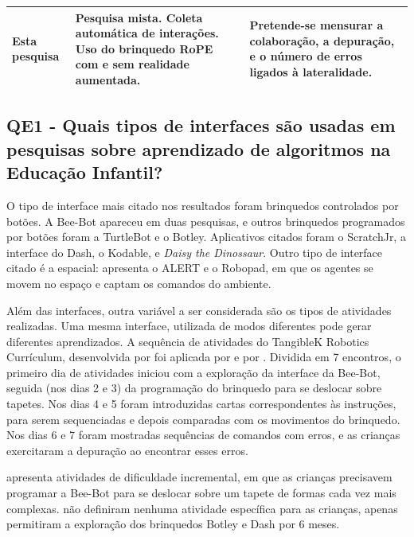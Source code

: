 {\begin{landscape}
\begin{footnotesize}
\begin{longtable}{|p{6cm}|p{8cm}|p{8cm}|}
    Esta pesquisa & Pesquisa mista. Coleta automática de interações. Uso do brinquedo RoPE com e sem realidade aumentada. & Pretende-se mensurar a colaboração, a depuração, e o número de erros ligados à lateralidade. \\ \hline
    
    \end{longtable}   
\end{footnotesize}

\end{landscape}

\subsection{QE1 - Quais tipos de interfaces são usadas em pesquisas sobre aprendizado de algoritmos na Educação Infantil? }

O tipo de interface mais citado nos resultados foram brinquedos controlados por botões. A Bee-Bot apareceu em duas pesquisas, e outros brinquedos programados por botões foram a TurtleBot e o Botley. Aplicativos citados foram o ScratchJr, a interface do Dash, o Kodable, e \textit{Daisy the Dinossaur}. Outro tipo de interface citado é a espacial:  apresenta o ALERT e o Robopad, em que os agentes se movem no espaço e captam os comandos do ambiente.

Além das interfaces, outra variável a ser considerada são os tipos de atividades realizadas. Uma mesma interface, utilizada de modos diferentes pode gerar diferentes aprendizados. A sequência de atividades do TangibleK Robotics Currículum, desenvolvida por  foi aplicada por  e por . Dividida em 7 encontros, o primeiro dia de atividades iniciou com a exploração da interface da Bee-Bot, seguida (nos dias 2 e 3) da programação do brinquedo para se deslocar sobre tapetes. Nos dias 4 e 5 foram introduzidas cartas correspondentes às instruções, para serem sequenciadas e depois comparadas com os movimentos do brinquedo. Nos dias 6 e 7 foram mostradas sequências de comandos com erros, e as crianças exercitaram a depuração ao encontrar esses erros.

 apresenta atividades de dificuldade incremental, em que as crianças precisavem programar a Bee-Bot para se deslocar sobre um tapete de formas cada vez mais complexas.  não definiram nenhuma atividade específica para as crianças, apenas permitiram a exploração dos brinquedos Botley e Dash por 6 meses.

}
